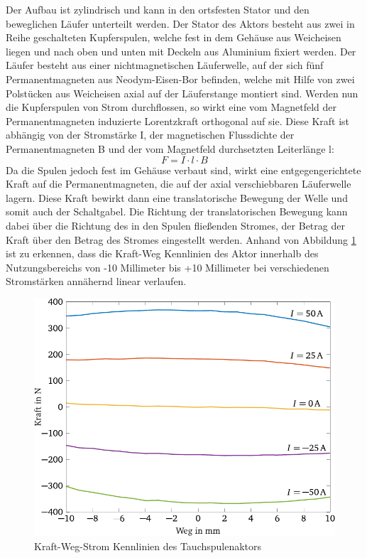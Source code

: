 Der Aufbau ist zylindrisch und kann in den ortsfesten Stator und den beweglichen Läufer unterteilt werden. Der Stator des Aktors besteht aus zwei in Reihe geschalteten Kupferspulen, welche fest in dem Gehäuse aus Weicheisen liegen und nach oben und unten mit Deckeln aus Aluminium fixiert werden. Der Läufer besteht aus einer nichtmagnetischen Läuferwelle, auf der sich fünf Permanentmagneten aus Neodym-Eisen-Bor befinden, welche mit Hilfe von zwei Polstücken aus Weicheisen axial auf der Läuferstange montiert sind. 
Werden nun die Kupferspulen von Strom durchflossen, so wirkt eine vom Magnetfeld der Permanentmagneten induzierte Lorentzkraft orthogonal auf sie. Diese Kraft ist abhängig von der Stromstärke I, der magnetischen Flussdichte der Permanentmagneten B und der vom Magnetfeld durchsetzten Leiterlänge l:
\begin{equation}\label{eq:lorentz}
F=I\cdot l\cdot B
\end{equation}
Da die Spulen jedoch fest im Gehäuse verbaut sind, wirkt eine entgegengerichtete Kraft auf die Permanentmagneten, die auf der axial verschiebbaren Läuferwelle lagern. Diese Kraft bewirkt dann eine translatorische Bewegung der Welle und somit auch der Schaltgabel. Die Richtung der translatorischen Bewegung kann dabei über die Richtung des in den Spulen fließenden Stromes, der Betrag der Kraft über den Betrag des Stromes eingestellt werden.
Anhand von Abbildung \ref{fig:Kennlinie Aktor} ist zu erkennen, dass die Kraft-Weg Kennlinien des Aktor innerhalb des Nutzungsbereichs von -10 Millimeter bis +10 Millimeter bei verschiedenen Stromstärken annähernd linear verlaufen. 

\begin{figure}[h]
	\centering
		\includegraphics{Bilder/KennlinieAktor.pdf}
	\caption{Kraft-Weg-Strom Kennlinien des Tauchspulenaktors \cite[S.12]{adp}}
	\label{fig:Kennlinie Aktor}
\end{figure}

